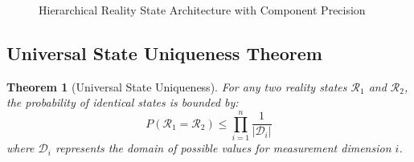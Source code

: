 \documentclass[12pt,a4paper]{article}
\newtheorem{theorem}{Theorem}
\begin{document}
\begin{figure}[H]
\caption{Hierarchical Reality State Architecture with Component Precision}
\label{fig:reality_state_hierarchy}
\end{figure}

\subsection{Universal State Uniqueness Theorem}

\begin{theorem}[Universal State Uniqueness]
For any two reality states $\mathcal{R}_1$ and $\mathcal{R}_2$, the probability of identical states is bounded by:
\begin{equation}
P(\mathcal{R}_1 = \mathcal{R}_2) \leq \prod_{i=1}^{n} \frac{1}{|\mathcal{D}_i|}
\end{equation}
where $\mathcal{D}_i$ represents the domain of possible values for measurement dimension $i$.
\end{theorem}
\end{document}
